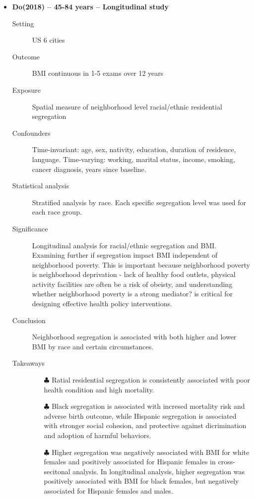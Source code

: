 \documentclass{article}
\begin{document}
\begin{itemize}
\item{\bf Do(2018) -- 45-84 years  -- Longitudinal study}
		\begin{description}
			\item[Setting] US 6 cities
			\item[Outcome] BMI continuous in 1-5 exams over 12 years
			\item[Exposure] Spatial measure of neighborhood level racial/ethnic residential segregation
			\item[Confounders] Time-invariant: age, sex, nativity, education, duration of residence, language. Time-varying: working, marital status, income, smoking, cancer diagnosis, years since baseline.
			\item[Statistical analysis] Stratified analysis by race. Each specific segregation level was used for each race group.
			\item[Significance] Longitudinal analysis for racial/ethnic segregation and BMI. Examining further if segregation impact BMI independent of neighborhood poverty. This is important because neighborhood poverty is neighborhood deprivation - lack of healthy food outlets, physical activity facilities are often be a risk of obeisty, and understanding whether neighborhood poverty is a strong mediator? is critical for designing effective health policy interventions.
			\item[Conclusion] Neighborhood segregation is associated with both higher and lower BMI by race and certain circumstances.
			\item[Takeaways] \mbox{}\par
				\begin{itemize}
					\item[$\clubsuit$] Ratial residential segregation is consistently associated with poor health condition and high mortality.
					\item[$\clubsuit$] Black segregation is associated with incresed mortality risk and adverse birth outcome, while Hispanic segregation is associated with stronger social cohesion, and protective against dicrimination and adoption of harmful behaviors.
					\item[$\clubsuit$] Higher segregation was negatively associated with BMI for white females and positively associated for Hispanic females in cross-secitonal analysis. In longitudinal analysis, higher segregation was positively associated with BMI for black females, but negatively associated for Hispanic females and males.
				\end{itemize} 
		\end{description}


\end{itemize}
\end{document}
